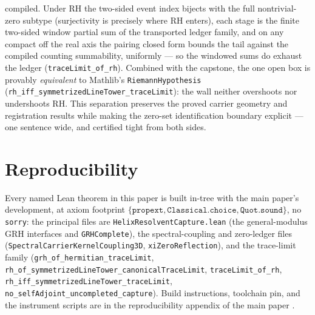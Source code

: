 \documentclass[11pt]{article}
\theoremstyle{definition}
\begin{document}
compiled.  Under RH the two-sided event index bijects with the full
nontrivial-zero subtype (surjectivity is precisely where RH enters), each
stage is the finite two-sided window partial sum of the transported ledger
family, and on any compact off the real axis the pairing closed form bounds
the tail against the compiled counting summability, uniformly --- so the
windowed sums do exhaust the ledger (\texttt{traceLimit\_of\_rh}).  Combined
with the capstone, the one open box is provably \emph{equivalent} to
Mathlib's \texttt{RiemannHypothesis}
(\texttt{rh\_iff\_symmetrizedLineTower\_traceLimit}): the wall neither
overshoots nor undershoots RH.  This separation preserves the proved carrier
geometry and registration results while making the zero-set identification
boundary explicit --- one sentence wide, and certified tight from both
sides.

\section{Reproducibility}\label{sec:grh-repro}

Every named Lean theorem in this paper is built in-tree with the main
paper's development, at axiom footprint
$\{\texttt{propext},\texttt{Classical.choice},\texttt{Quot.sound}\}$, no
\texttt{sorry}: the principal files are
\texttt{HelixResolventCapture.lean} (the general-modulus GRH interfaces and
\texttt{GRHComplete}), the spectral-coupling and zero-ledger files
(\texttt{SpectralCarrierKernelCoupling3D}, \texttt{xiZeroReflection}), and
the trace-limit family
(\texttt{grh\_of\_hermitian\_traceLimit},
\texttt{rh\_of\_symmetrizedLineTower\_canonicalTraceLimit},
\texttt{traceLimit\_of\_rh},
\texttt{rh\_iff\_symmetrizedLineTower\_traceLimit},
\texttt{no\_selfAdjoint\_uncompleted\_capture}).  Build instructions,
toolchain pin, and the instrument scripts are in the reproducibility
appendix of the main paper \cite{UniversalCarrier}.
\end{document}
